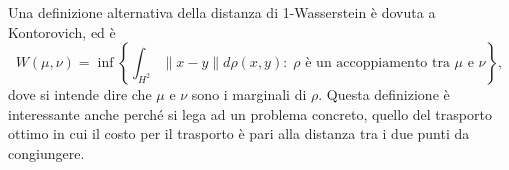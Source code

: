 Una definizione alternativa della distanza di 1-Wasserstein è dovuta a Kontorovich, ed è 
$$W(\mu,\nu) = \inf\left\{\int_{H^{2}}\|x-y\|d\rho(x,y):\; \rho\text{ è un accoppiamento tra $\mu$ e $\nu$}\right\},$$
dove si intende dire che $\mu$ e $\nu$ sono i marginali di $\rho$. 
Questa definizione è interessante anche perché si lega ad un problema concreto, quello del trasporto ottimo in cui il costo per il trasporto è pari alla distanza tra i due punti da congiungere.









































